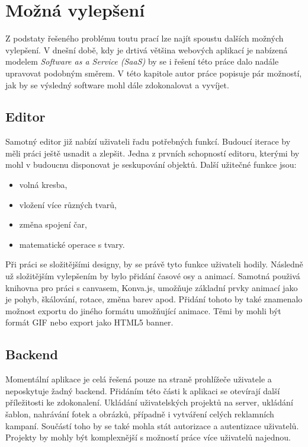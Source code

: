 \chapter{Možná vylepšení}
\label{chap:future}
Z podstaty řešeného problému toutu prací lze najít spoustu dalších možných vylepšení. V dnešní době, kdy je drtivá většina webových
aplikací je nabízená modelem \emph{Software as a Service (SaaS)} by se i řešení této práce dalo nadále upravovat podobným směrem.
V této kapitole autor práce popisuje pár možností, jak by se výsledný software mohl dále zdokonalovat a vyvíjet.

\section{Editor}
Samotný editor již nabízí uživateli řadu potřebných funkcí. Budoucí iterace by měli práci ještě usnadit a zlepšit. Jedna z prvních schopností
editoru, kterými by mohl v budoucnu disponovat je seskupování objektů. Další užitečné funkce jsou:
\begin{itemize}
    \item volná kresba,
    \item vložení více různých tvarů,
    \item změna spojení čar,
    \item matematické operace s tvary.
\end{itemize}
Při práci se složitějšími designy, by se právě tyto funkce uživateli hodily.
Následně už složitějším vylepšením by bylo přidání časové osy a animací. Samotná použivá knihovna pro práci s canvasem, Konva.js, umožňuje základní
prvky animací jako je pohyb, škálování, rotace, změna barev apod. Přidání tohoto by také znamenalo možnost exportu do jiného formátu umožňující animace.
Těmi by mohli být formát GIF nebo export jako HTML5 banner.

\section{Backend}
Momentální aplikace je celá řešená pouze na straně prohlížeče uživatele a neposkytuje žadný backend. Přidáním této části k aplikaci se otevírají
další příležitosti ke zdokonalení. Ukládání uživatelských projektů na server, ukládání šablon, nahrávání fotek a obrázků, případně i vytváření celých reklamních 
kampaní. Součástí toho by se také mohla stát autorizace a autentizace uživatelů. Projekty by mohly být komplexnější s možností práce více uživatelů najednou.

